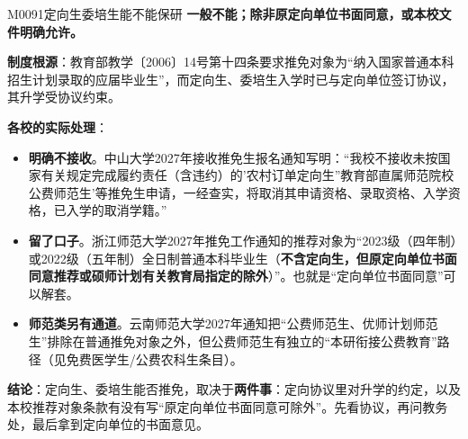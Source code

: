 \begin{qa}{M0091}{定向生委培生能不能保研}
\textbf{一般不能；除非原定向单位书面同意，或本校文件明确允许。}

\textbf{制度根源}：教育部教学〔2006〕14号第十四条要求推免对象为“纳入国家普通本科招生计划录取的应届毕业生”，而定向生、委培生入学时已与定向单位签订协议，其升学受协议约束。

\textbf{各校的实际处理}：

\begin{itemize}
  \item \textbf{明确不接收}。中山大学2027年接收推免生报名通知写明：“我校不接收未按国家有关规定完成履约责任（含违约）的'农村订单定向生''教育部直属师范院校公费师范生'等推免生申请，一经查实，将取消其申请资格、录取资格、入学资格，已入学的取消学籍。”
  \item \textbf{留了口子}。浙江师范大学2027年推免工作通知的推荐对象为“2023级（四年制）或2022级（五年制）全日制普通本科毕业生（\textbf{不含定向生，但原定向单位书面同意推荐或硕师计划有关教育局指定的除外}）”。也就是“定向单位书面同意”可以解套。
  \item \textbf{师范类另有通道}。云南师范大学2027年通知把“公费师范生、优师计划师范生”排除在普通推免对象之外，但公费师范生有独立的“本研衔接公费教育”路径（见免费医学生/公费农科生条目）。
\end{itemize}

\textbf{结论}：定向生、委培生能否推免，取决于\textbf{两件事}：定向协议里对升学的约定，以及本校推荐对象条款有没有写“原定向单位书面同意可除外”。先看协议，再问教务处，最后拿到定向单位的书面意见。
\end{qa}

